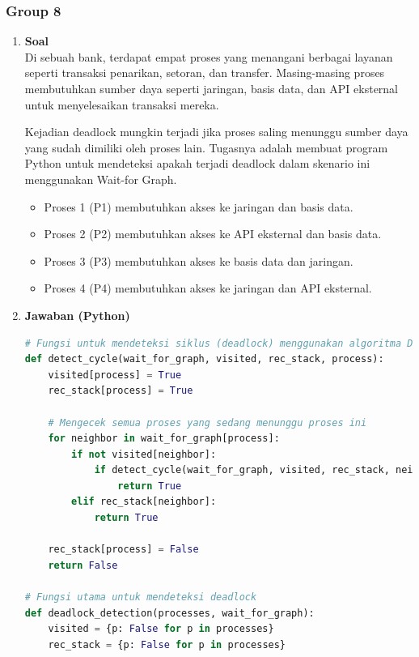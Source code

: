 \documentclass[12pt]{article}
\begin{document}
\subsubsection{Group 8}
\begin{enumerate}[label=\alph*.]
\item  \textbf{Soal} \\
Di sebuah bank, terdapat empat proses yang menangani berbagai layanan seperti transaksi penarikan, setoran, dan transfer. Masing-masing proses membutuhkan sumber daya seperti jaringan, basis data, dan API eksternal untuk menyelesaikan transaksi mereka.

Kejadian deadlock mungkin terjadi jika proses saling menunggu sumber daya yang sudah dimiliki oleh proses lain. Tugasnya adalah membuat program Python untuk mendeteksi apakah terjadi deadlock dalam skenario ini menggunakan Wait-for Graph.

\begin{itemize}
    \item Proses 1 (P1) membutuhkan akses ke jaringan dan basis data.
    \item Proses 2 (P2) membutuhkan akses ke API eksternal dan basis data.
    \item Proses 3 (P3) membutuhkan akses ke basis data dan jaringan.
    \item Proses 4 (P4) membutuhkan akses ke jaringan dan API eksternal.
\end{itemize}


    \item \textbf{Jawaban (Python)}
\begin{lstlisting}[language=Python, caption=Deadlock Detection in Python, label=lst:pythoncode, frame=single, backgroundcolor=\color{lightgray}, basicstyle=\ttfamily\small, breaklines=true, xleftmargin=1em, xrightmargin=1em]
# Fungsi untuk mendeteksi siklus (deadlock) menggunakan algoritma DFS
def detect_cycle(wait_for_graph, visited, rec_stack, process):
    visited[process] = True
    rec_stack[process] = True

    # Mengecek semua proses yang sedang menunggu proses ini
    for neighbor in wait_for_graph[process]:
        if not visited[neighbor]:
            if detect_cycle(wait_for_graph, visited, rec_stack, neighbor):
                return True
        elif rec_stack[neighbor]:
            return True

    rec_stack[process] = False
    return False

# Fungsi utama untuk mendeteksi deadlock
def deadlock_detection(processes, wait_for_graph):
    visited = {p: False for p in processes}
    rec_stack = {p: False for p in processes}


\end{lstlisting}
\end{enumerate}
\end{document}
